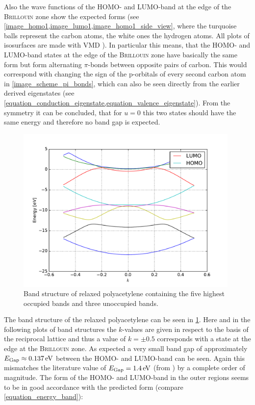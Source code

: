 Also the wave functions of the HOMO- and LUMO-band at the edge of the \textsc{Brillouin} zone show the expected forms (see \cref{image_homo1,image_lumo1,image_homo1_side_view}, where the turquoise balls represent the carbon atoms, the white ones the hydrogen atoms. All plots of isosurfaces are made with VMD \cite{HUMP96}). In particular this means, that the HOMO- and LUMO-band states at the edge of the \textsc{Brillouin} zone have basically the same form but form alternating $\pi$-bonds between opposite pairs of carbon. This would correspond with changing the sign of the p-orbitals of every second carbon atom in \cref{image_scheme_pi_bonds}, which can also be seen directly from the earlier derived eigenstates (see \cref{equation_conduction_eigenstate,equation_valence_eigenstate}). From the symmetry it can be concluded, that for $u=0$ this two states should have the same energy and therefore no band gap is expected.\\
\begin{figure}
	\centering
	\includegraphics[width = 11cm]{Images/polyacetylene/bands/band_structure}
	\caption{Band structure of relaxed polyacetylene containing the five highest occupied bands and three unoccupied bands.}
	\label{image_band_structure_relaxed_polyacetylene}
\end{figure}
The band structure of the relaxed polyacetylene can be seen in \cref{image_band_structure_relaxed_polyacetylene}. Here and in the following plots of band structures the $k$-values are given in respect to the basis of the reciprocal lattice and thus a value of $k = \pm 0.5$ corresponds with a state at the edge at the \textsc{Brillouin} zone. As expected a very small band gap of approximately $E_\text{Gap} \approx \unit[0.137]{eV}$ between the HOMO- and LUMO-band can be seen. Again this mismatches the literature value of $E_\text{Gap} = \unit[1.4]{eV}$  (from \cite{PhysRevLett.42.1698}) by a complete order of magnitude. The form of the HOMO- and LUMO-band in the outer regions seems to be in good accordance with the predicted form (compare \cref{equation_energy_band}):
